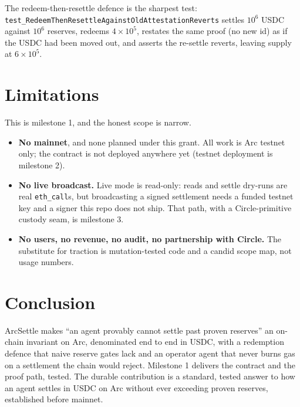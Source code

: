 \documentclass[11pt]{article}
\begin{document}
The redeem-then-resettle defence is the sharpest test:
\texttt{test\_RedeemThenResettleAgainstOldAttestationReverts} settles $10^6$ USDC against
$10^6$ reserves, redeems $4\times10^5$, restates the same proof (no new id) as if the USDC
had been moved out, and asserts the re-settle reverts, leaving supply at $6\times10^5$.

\section{Limitations}\label{sec:limits}
This is milestone 1, and the honest scope is narrow.
\begin{itemize}[leftmargin=1.4em]
\item \textbf{No mainnet}, and none planned under this grant. All work is Arc testnet only;
the contract is not deployed anywhere yet (testnet deployment is milestone 2).
\item \textbf{No live broadcast.} Live mode is read-only: reads and settle dry-runs are
real \texttt{eth\_call}s, but broadcasting a signed settlement needs a funded testnet key
and a signer this repo does not ship. That path, with a Circle-primitive custody seam, is
milestone 3.
\item \textbf{No users, no revenue, no audit, no partnership with Circle.} The substitute
for traction is mutation-tested code and a candid scope map, not usage numbers.
\end{itemize}

\section{Conclusion}
ArcSettle makes ``an agent provably cannot settle past proven reserves'' an on-chain
invariant on Arc, denominated end to end in USDC, with a redemption defence that naive
reserve gates lack and an operator agent that never burns gas on a settlement the chain
would reject. Milestone 1 delivers the contract and the proof path, tested. The durable
contribution is a standard, tested answer to how an agent settles in USDC on Arc without
ever exceeding proven reserves, established before mainnet.



\end{document}
